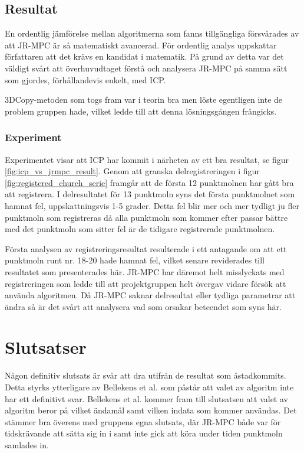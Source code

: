 \subsection{Resultat}

En ordentlig jämförelse mellan algoritmerna som fanns tillgängliga försvårades av att JR-MPC är så matematiskt avancerad. För ordentlig analys uppskattar författaren att det krävs en kandidat i matematik. På grund av detta var det väldigt svårt att överhuvudtaget förstå och analysera JR-MPC på samma sätt som gjordes, förhållandevis enkelt, med ICP. 

3DCopy-metoden som togs fram var i teorin bra men löste egentligen inte de problem gruppen hade, vilket ledde till att denna lösningsgången frångicks. 


\subsubsection{Experiment}

Experimentet visar att ICP har kommit i närheten av ett bra resultat, se figur \ref{fig:icp_vs_jrmpc_result}. Genom att granska delregistreringen i figur \ref{fig:registered_church_serie} framgår att de första 12 punktmolnen har gått bra att registrera. I delresultatet för 13 punktmoln syns det första punktmolnet som hamnat fel, uppskattningsvis 1-5 grader. Detta fel blir mer och mer tydligt ju fler punktmoln som registreras då alla punktmoln som kommer efter passar bättre med det punktmoln som sitter fel är de tidigare registrerade punktmolnen. 

Första analysen av registreringsresultat resulterade i ett antagande om att ett punktmoln runt nr. 18-20 hade hamnat fel, vilket senare reviderades till resultatet som presenterades här. JR-MPC har däremot helt misslyckats med registreringen som ledde till att projektgruppen helt övergav vidare försök att använda algoritmen. Då JR-MPC saknar delresultat eller tydliga parametrar att ändra så är det svårt att analysera vad som orsakar beteendet som syns här.

\section{Slutsatser}
\label{sec:conclusions-karlsson}

Någon definitiv slutsats är svår att dra utifrån de resultat som åstadkommits. Detta styrks ytterligare av Bellekens et al. \cite{registration_comparing} som påstår att valet av algoritm inte har ett definitivt svar. Bellekens et al. kommer fram till slutsatsen att valet av algoritm beror på vilket ändamål samt vilken indata som kommer användas. Det stämmer bra överens med gruppens egna slutsats, där JR-MPC både var för tidskrävande att sätta sig in i samt inte gick att köra under tiden punktmoln samlades in.

